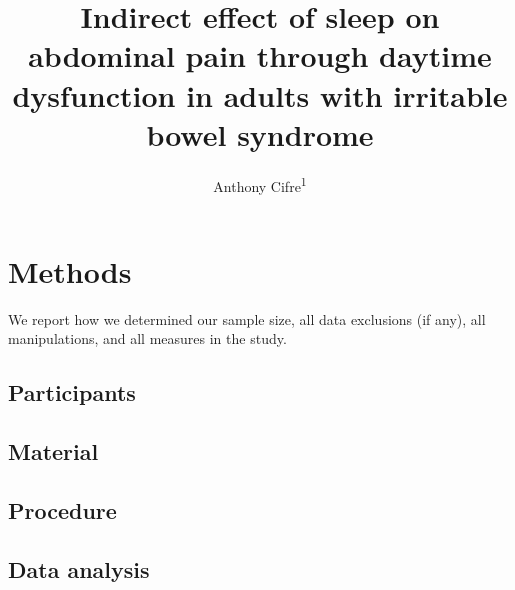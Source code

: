 \documentclass[
  man]{apa6}
\title{Indirect effect of sleep on abdominal pain through daytime dysfunction in adults with irritable bowel syndrome}
\author{Anthony Cifre\textsuperscript{1}}
\date{}
\affiliation{\vspace{0.5cm}\textsuperscript{1} University of Houston}
\begin{document}
\maketitle

\hypertarget{methods}{%
\section{Methods}\label{methods}}

We report how we determined our sample size, all data exclusions (if any), all manipulations, and all measures in the study.

\hypertarget{participants}{%
\subsection{Participants}\label{participants}}

\hypertarget{material}{%
\subsection{Material}\label{material}}

\hypertarget{procedure}{%
\subsection{Procedure}\label{procedure}}

\hypertarget{data-analysis}{%
\subsection{Data analysis}\label{data-analysis}}
\end{document}
